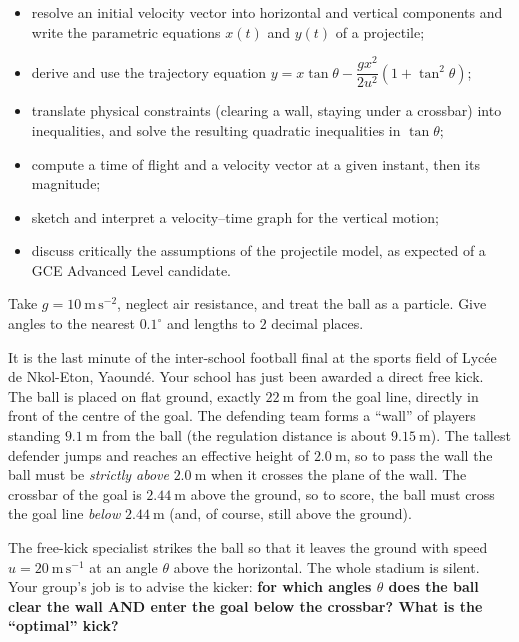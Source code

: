 \documentclass[11pt]{article}
\newcommand{\cle}[1]{{\popxbold\color{popdark}#1}}
\newcounter{popsec}
\newcounter{popsub}
\newcommand{\courssub}[1]{%
  \stepcounter{popsub}%
  \par\vspace{9pt}\noindent{\popxbold\fontsize{11.5}{13}\selectfont\color{popink}{\color{poporange}\thepopsec.\thepopsub}\hspace{6pt}#1}\par\nopagebreak\vspace{4pt}
}
\begin{document}
\begin{itemize}
\item resolve an initial velocity vector into horizontal and vertical components and write the parametric equations $x(t)$ and $y(t)$ of a projectile;
\item derive and use the \cle{trajectory equation} $y = x\tan\theta - \dfrac{gx^{2}}{2u^{2}}(1+\tan^{2}\theta)$;
\item translate physical constraints (clearing a wall, staying under a crossbar) into inequalities, and solve the resulting \cle{quadratic inequalities in $\tan\theta$};
\item compute a time of flight and a velocity vector at a given instant, then its magnitude;
\item sketch and interpret a \cle{velocity--time graph} for the vertical motion;
\item discuss critically the assumptions of the projectile model, as expected of a GCE Advanced Level candidate.
\end{itemize}

\begin{aretenir}
Take $g = 10\ \mathrm{m\,s^{-2}}$, neglect air resistance, and treat the ball as a particle. Give angles to the nearest $0.1^{\circ}$ and lengths to $2$ decimal places.
\end{aretenir}

\courssub{Situation}

It is the last minute of the inter-school football final at the sports field of Lyc\'ee de Nkol-Eton, Yaound\'e. Your school has just been awarded a direct free kick. The ball is placed on flat ground, exactly $22\ \mathrm{m}$ from the goal line, directly in front of the centre of the goal. The defending team forms a ``wall'' of players standing $9.1\ \mathrm{m}$ from the ball (the regulation distance is about $9.15\ \mathrm{m}$). The tallest defender jumps and reaches an effective height of $2.0\ \mathrm{m}$, so to pass the wall the ball must be \emph{strictly above} $2.0\ \mathrm{m}$ when it crosses the plane of the wall. The crossbar of the goal is $2.44\ \mathrm{m}$ above the ground, so to score, the ball must cross the goal line \emph{below} $2.44\ \mathrm{m}$ (and, of course, still above the ground).

The free-kick specialist strikes the ball so that it leaves the ground with speed $u = 20\ \mathrm{m\,s^{-1}}$ at an angle $\theta$ above the horizontal. The whole stadium is silent. Your group's job is to advise the kicker: \textbf{for which angles $\theta$ does the ball clear the wall AND enter the goal below the crossbar? What is the ``optimal'' kick?}
\end{document}
